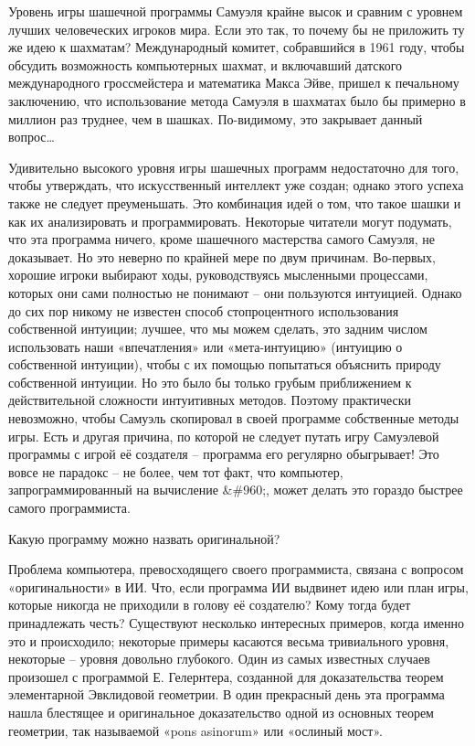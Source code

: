 \documentclass[../main.tex]{subfiles}
\begin{document}
Уровень игры шашечной программы Самуэля крайне высок и сравним с уровнем лучших человеческих игроков мира. Если это так, то почему бы не приложить ту же идею к шахматам? Международный комитет, собравшийся в 1961 году, чтобы обсудить возможность компьютерных шахмат, и включавший датского международного гроссмейстера и математика Макса Эйве, пришел к печальному заключению, что использование метода Самуэля в шахматах было бы примерно в миллион раз труднее, чем в шашках. По-видимому, это закрывает данный вопрос\ldots{}

Удивительно высокого уровня игры шашечных программ недостаточно для того, чтобы утверждать, что искусственный интеллект уже создан; однако этого успеха также не следует преуменьшать. Это комбинация идей о том, что такое шашки и как их анализировать и программировать. Некоторые читатели могут подумать, что эта программа ничего, кроме шашечного мастерства самого Самуэля, не доказывает. Но это неверно по крайней мере по двум причинам. Во-первых, хорошие игроки выбирают ходы, руководствуясь мысленными процессами, которых они сами полностью не понимают \--- они пользуются интуицией. Однако до сих пор никому не известен способ стопроцентного использования собственной интуиции; лучшее, что мы можем сделать, это задним числом использовать наши «впечатления» или «мета-интуицию» (интуицию о собственной интуиции), чтобы с их помощью попытаться объяснить природу собственной интуиции. Но это было бы только грубым приближением к действительной сложности интуитивных методов. Поэтому практически невозможно, чтобы Самуэль скопировал в своей программе собственные методы игры. Есть и другая причина, по которой не следует путать игру Самуэлевой программы с игрой её создателя \--- программа его регулярно обыгрывает! Это вовсе не парадокс \--- не более, чем тот факт, что компьютер, запрограммированный на вычисление \&\#960;, может делать это гораздо быстрее самого программиста.

Какую программу можно назвать оригинальной?

Проблема компьютера, превосходящего своего программиста, связана с вопросом «оригинальности» в ИИ\@. Что, если программа ИИ выдвинет идею или план игры, которые никогда не приходили в голову её создателю? Кому тогда будет принадлежать честь? Существуют несколько интересных примеров, когда именно это и происходило; некоторые примеры касаются весьма тривиального уровня, некоторые \--- уровня довольно глубокого. Один из самых известных случаев произошел с программой Е. Гелернтера, созданной для доказательства теорем элементарной Эвклидовой геометрии. В один прекрасный день эта программа нашла блестящее и оригинальное доказательство одной из основных теорем геометрии, так называемой «pons asinorum» или «ослиный мост».
\end{document}
